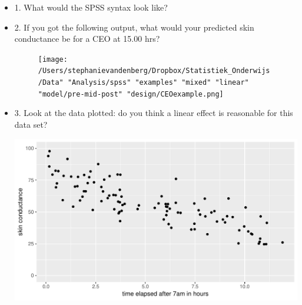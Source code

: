 \documentclass[]{report}\usepackage[]{graphicx}\usepackage[]{color}
\makeatletter
\def\maxwidth{ %
  \ifdim\Gin@nat@width>\linewidth
    \linewidth
  \else
    \Gin@nat@width
  \fi
}
\newenvironment{knitrout}{}{} %
\makeatother
\begin{document}
\begin{itemize}
\item 1. What would the SPSS syntax look like? \\
\item 2. If you got the following output, what would your predicted skin conductance be for a CEO at 15.00 hrs? \\
\begin{figure}[h]
    \begin{center}
       \texttt{[image: /Users/stephanievandenberg/Dropbox/Statistiek\_Onderwijs/Data" "Analysis/spss" "examples" "mixed" "linear" "model/pre-mid-post" "design/CEOexample.png]}
    \end{center}
\end{figure}



\item 3. Look at the data plotted: do you think a linear effect is reasonable for this data set?

\begin{knitrout}
\color{fgcolor}

{\centering \includegraphics[width=\maxwidth]{figure/analysispremidpost7-1} 

}



\end{knitrout}





\end{itemize}
\end{document}
